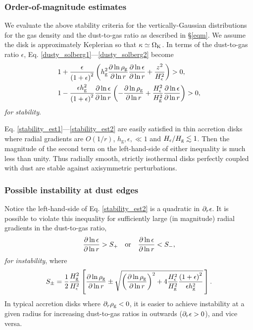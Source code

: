 
\subsubsection{Order-of-magnitude estimates} 
We evaluate the above stability criteria for the vertically-Gaussian
distributions for the gas density and the dust-to-gas ratio as 
described in \S\ref{eqm}. 
We assume the disk is approximately Keplerian so that
$\kappa\simeq\Omega_{\rm K}$. In terms of the dust-to-gas
ratio $\epsilon$, Eq. \ref{dusty_solberg1}---\ref{dusty_solberg2}
become   
\begin{align}
  &1 + \frac{\epsilon}{\left(1+
    \epsilon\right)^2}\left(h_\mathrm{g}^2\frac{\partial\ln{\rho_\mathrm{g}}}{\partial\ln{r}}
  \frac{\partial\ln{\epsilon}}{\partial\ln{r}} + 
  \frac{z^2}{H_\epsilon^2}\right)>0 \label{stability_est1},   \\ 
&1 - \frac{\epsilon
  h_\mathrm{g}^2}{\left(1+\epsilon\right)^2}
  \frac{\partial\ln{\epsilon}}{\partial\ln{r}}\left(-\frac{\partial\ln{\rho_\mathrm{g}}}{\partial\ln{r}}+\frac{H_\epsilon^2}{H_\mathrm{g}^2}\frac{\partial\ln{\epsilon}}{\partial\ln{r}}\right)
  > 0 \label{stability_est2},
\end{align}
\emph{for stability}. 

Eq. \ref{stability_est1}---\ref{stability_est2} are easily satisfied
in thin accretion disks where radial gradients are $O(1/r)$, 
$h_\mathrm{g},\epsilon,\ll 1$ and $
H_\epsilon/H_\mathrm{g}\lesssim 1$. Then the
magnitude of the second term on the left-hand-side  of either
inequality is much less than unity. Thus radially smooth, strictly
isothermal disks perfectly coupled with dust are stable against
axisymmetric perturbations.  


\subsubsection{Possible instability at dust edges}
Notice the left-hand-side of Eq. \ref{stability_est2} is a quadratic in
$\partial_r\epsilon$. It is possible to
violate this inequality for sufficiently large (in magnitude) radial
gradients  in the dust-to-gas ratio, 
\begin{align}
  \frac{\partial\ln{\epsilon}}{\partial\ln{r}} > S_+ \quad \mathrm{or} \quad 
  \frac{\partial\ln{\epsilon}}{\partial\ln{r}} < S_-,
\end{align}
\emph{for instability}, where
\begin{align}\label{spm}
S_\pm = \frac{1}{2}\frac{H_\mathrm{g}^2}{H_\epsilon^2} 
  \left[
  \frac{\partial\ln{\rho_\mathrm{g}}}{\partial\ln{r}} \pm 
  \sqrt{
  \left(\frac{\partial\ln{\rho_\mathrm{g}}}{\partial\ln{r}}\right)^2 + 
  4 \frac{H_\epsilon^2}{H_\mathrm{g}^2}
  \frac{\left(1+\epsilon\right)^2}{\epsilon h_\mathrm{g}^2}
  }
  \,\right]. 
\end{align} 
In typical accretion disks where $\partial_r\rho_\mathrm{g}<0$, it is easier to
achieve instability at a given radius for increasing dust-to-gas
ratios in outwards ($\partial_r\epsilon > 0$), and vice versa.  

